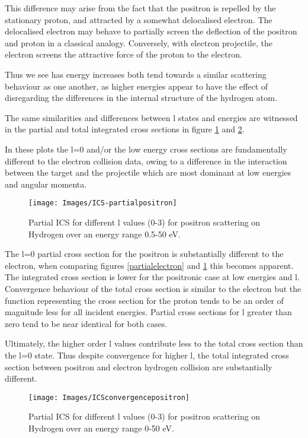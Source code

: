 \documentclass{article}
\begin{document}
     This difference may arise from the fact that the positron is repelled by the stationary proton, and attracted by a somewhat delocalised electron. The delocalised electron may behave to partially screen the deflection of the positron and proton in a classical analogy. Conversely, with electron projectile, the electron screens the attractive force of the proton to the electron. 
     
     Thus we see has energy increases both tend towards a similar scattering behaviour as one another, as higher energies appear to have the effect of disregarding the differences in the internal structure of the hydrogen atom. 
     
     The same similarities and differences between l states and energies are witnessed in the partial and total integrated cross sections in figure \ref{partialpositron} and \ref{totalpositron}. 
     
     In these plots the l=0 and/or the low energy cross sections are fundamentally different to the electron collision data, owing to a difference in the interaction between the target and the projectile which are most dominant at low energies and angular momenta. 
     
     \begin{figure}[H]
     	\centering
     	\texttt{[image: Images/ICS-partialpositron]}
     	\caption{Partial ICS for different l values (0-3) for positron scattering on Hydrogen over an energy range 0.5-50 eV. \label{partialpositron}}
     \end{figure}
     
     The l=0 partial cross section for the positron is substantially different to the electron, when comparing figures \ref{partialelectron} and \ref{partialpositron} this becomes apparent. The integrated cross section is lower for the positronic case at low energies and l. Convergence behaviour of the total cross section is similar to the electron but the function representing the cross section for the proton tends to be an order of magnitude less for all incident energies. Partial cross sections for l greater than zero tend to be near identical for both cases. 
     
     Ultimately, the higher order l values contribute less to the total cross section than the l=0 state. Thus despite convergence for higher l, the total integrated cross section between positron and electron hydrogen collision are substantially different. 
  
     \begin{figure}[H]
     	\centering
     	\texttt{[image: Images/ICSconvergencepositron]}
     	\caption{Partial ICS for different l values (0-3) for positron scattering on Hydrogen over an energy range 0-50 eV. \label{totalpositron}}
     \end{figure}
     
\end{document}
